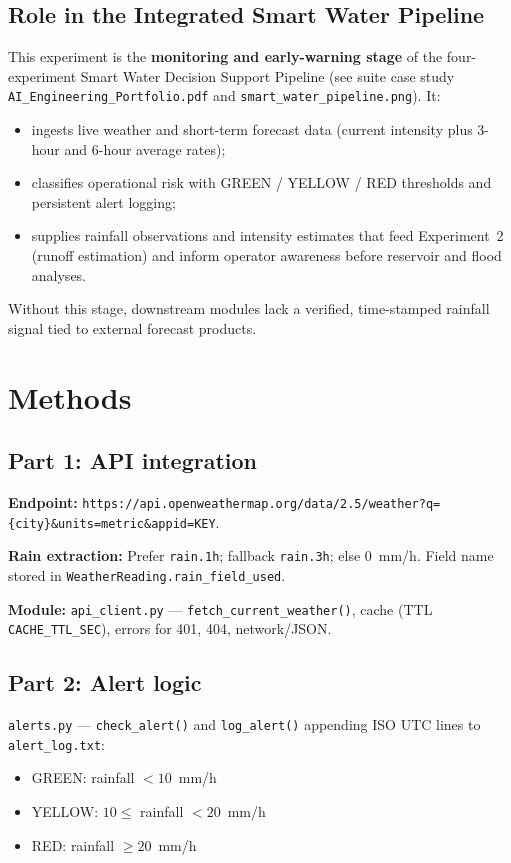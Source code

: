 \documentclass[11pt,a4paper]{article}
\begin{document}
\subsection{Role in the Integrated Smart Water Pipeline}
This experiment is the \textbf{monitoring and early-warning stage} of the four-experiment Smart Water Decision Support Pipeline (see suite case study \texttt{AI\_Engineering\_Portfolio.pdf} and \texttt{smart\_water\_pipeline.png}). It:
\begin{itemize}[noitemsep]
  \item ingests live weather and short-term forecast data (current intensity plus 3-hour and 6-hour average rates);
  \item classifies operational risk with GREEN / YELLOW / RED thresholds and persistent alert logging;
  \item supplies rainfall observations and intensity estimates that feed Experiment~2 (runoff estimation) and inform operator awareness before reservoir and flood analyses.
\end{itemize}
Without this stage, downstream modules lack a verified, time-stamped rainfall signal tied to external forecast products.

\section{Methods}

\subsection{Part 1: API integration}
\textbf{Endpoint:} \texttt{https://api.openweathermap.org/data/2.5/weather?q=\{city\}\&units=metric\&appid=KEY}.

\textbf{Rain extraction:} Prefer \texttt{rain.1h}; fallback \texttt{rain.3h}; else 0~mm/h. Field name stored in \texttt{WeatherReading.rain\_field\_used}.

\textbf{Module:} \texttt{api\_client.py} --- \texttt{fetch\_current\_weather()}, cache (TTL \texttt{CACHE\_TTL\_SEC}), errors for 401, 404, network/JSON.

\subsection{Part 2: Alert logic}
\texttt{alerts.py} --- \texttt{check\_alert()} and \texttt{log\_alert()} appending ISO UTC lines to \texttt{alert\_log.txt}:
\begin{itemize}[noitemsep]
  \item GREEN: rainfall $< 10$~mm/h
  \item YELLOW: $10 \le$ rainfall $< 20$~mm/h
  \item RED: rainfall $\ge 20$~mm/h
\end{itemize}
\end{document}
